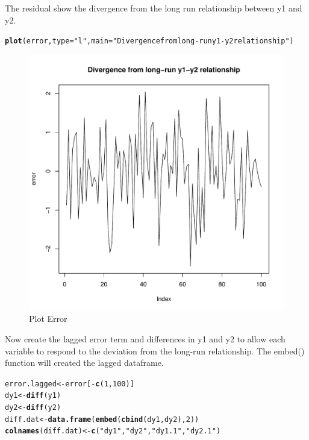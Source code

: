 \documentclass{article}\usepackage{graphicx, color}
\makeatletter
\def\maxwidth{ %
  \ifdim\Gin@nat@width>\linewidth
    \linewidth
  \else
    \Gin@nat@width
  \fi
}
\newcommand{\hlfunctioncall}[1]{\textcolor[rgb]{0.501960784313725,0,0.329411764705882}{\textbf{#1}}}%
\newcommand{\hlstring}[1]{\textcolor[rgb]{0.6,0.6,1}{#1}}%
\newenvironment{kframe}{%
 \def\at@end@of@kframe{}%
 \ifinner\ifhmode%
  \def\at@end@of@kframe{\end{minipage}}%
  \begin{minipage}{\columnwidth}%
 \fi\fi%
 \def\FrameCommand##1{\hskip\@totalleftmargin \hskip-\fboxsep
 \colorbox{shadecolor}{##1}\hskip-\fboxsep
     \hskip-\linewidth \hskip-\@totalleftmargin \hskip\columnwidth}%
 \MakeFramed {\advance\hsize-\width
   \@totalleftmargin\z@ \linewidth\hsize
   \@setminipage}}%
 {\par\unskip\endMakeFramed%
 \at@end@of@kframe}
\newenvironment{knitrout}{}{} %
\makeatother
\begin{document}
The residual show the divergence from the long run relationship between y1 and y2. 
\begin{knitrout}
\color{fgcolor}\begin{kframe}
\begin{alltt}
\hlfunctioncall{plot}(error, type = \hlstring{"l"}, main = \hlstring{"Divergence from long-run y1-y2 relationship"})
\end{alltt}
\end{kframe}\begin{figure}[]

\includegraphics[width=\maxwidth]{figure/Plot-EG2} \caption[Plot Error]{Plot Error\label{fig:Plot-EG2}}
\end{figure}


\end{knitrout}

Now create the lagged error term and differences in y1 and y2 to allow each variable to respond to the deviation from the long-run relationship.  The embed() function will created the lagged dataframe.  
\begin{knitrout}
\color{fgcolor}\begin{kframe}
\begin{alltt}
error.lagged <- error[-\hlfunctioncall{c}(1, 100)]
dy1 <- \hlfunctioncall{diff}(y1)
dy2 <- \hlfunctioncall{diff}(y2)
diff.dat <- \hlfunctioncall{data.frame}(\hlfunctioncall{embed}(\hlfunctioncall{cbind}(dy1, dy2), 2))
\hlfunctioncall{colnames}(diff.dat) <- \hlfunctioncall{c}(\hlstring{"dy1"}, \hlstring{"dy2"}, \hlstring{"dy1.1"}, \hlstring{"dy2.1"})
\end{alltt}
\end{kframe}
\end{knitrout}
\end{document}
